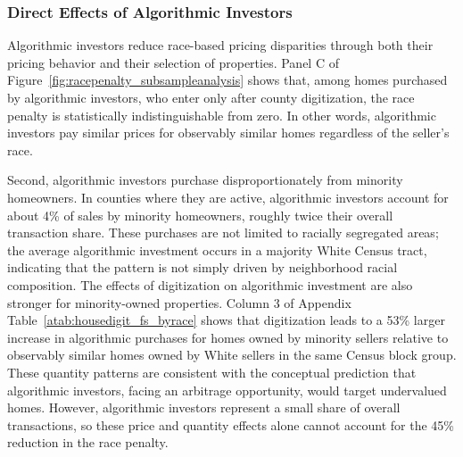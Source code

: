 \documentclass[11pt]{article}
\begin{document}
\subsubsection{Direct Effects of Algorithmic Investors}
Algorithmic investors reduce race-based pricing disparities through both their pricing behavior and their selection of properties. Panel C of Figure~\ref{fig:racepenalty_subsampleanalysis} shows that, among homes purchased by algorithmic investors, who enter only after county digitization, the race penalty is statistically indistinguishable from zero. In other words, algorithmic investors pay similar prices for observably similar homes regardless of the seller’s race. 

Second, algorithmic investors purchase disproportionately from minority homeowners. In counties where they are active, algorithmic investors account for about 4\% of sales by minority homeowners, roughly twice their overall transaction share. These purchases are not limited to racially segregated areas; the average algorithmic investment occurs in a majority White Census tract, indicating that the pattern is not simply driven by neighborhood racial composition. The effects of digitization on algorithmic investment are also stronger for minority-owned properties. Column 3 of Appendix Table~\ref{atab:housedigit_fs_byrace} shows that digitization leads to a 53\% larger increase in algorithmic purchases for homes owned by minority sellers relative to observably similar homes owned by White sellers in the same Census block group. These quantity patterns are consistent with the conceptual prediction that algorithmic investors, facing an arbitrage opportunity, would target undervalued homes. However, algorithmic investors represent a small share of overall transactions, so these price and quantity effects alone cannot account for the 45\% reduction in the race penalty.


\end{document}
